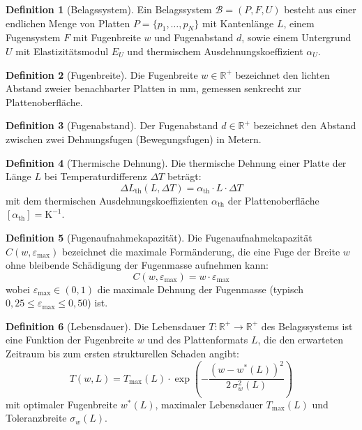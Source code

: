 ﻿\documentclass[a4paper,12pt]{article}
\theoremstyle{definition}
\newtheorem{definition}{Definition}
\begin{document}
\begin{definition}[Belagssystem]
	Ein Belagssystem $\mathcal{B} = (P, F, U)$ besteht aus einer endlichen
	Menge von Platten $P = \{p_1, \ldots, p_N\}$ mit Kantenlänge $L$,
	einem Fugensystem $F$ mit Fugenbreite $w$ und Fugenabstand $d$,
	sowie einem Untergrund $U$ mit Elastizitätsmodul $E_U$ und
	thermischem Ausdehnungskoeffizient $\alpha_U$.
\end{definition}

\begin{definition}[Fugenbreite]
	Die Fugenbreite $w \in \mathbb{R}^+$ bezeichnet den lichten Abstand
	zweier benachbarter Platten in mm, gemessen senkrecht zur
	Plattenoberfläche.
\end{definition}

\begin{definition}[Fugenabstand]
	Der Fugenabstand $d \in \mathbb{R}^+$ bezeichnet den Abstand
	zwischen zwei Dehnungsfugen (Bewegungsfugen) in Metern.
\end{definition}

\begin{definition}[Thermische Dehnung]
	Die thermische Dehnung einer Platte der Länge $L$ bei
	Temperaturdifferenz $\Delta T$ beträgt:
	\[
	\Delta L_{\text{th}}(L,\Delta T) = \alpha_{\text{th}} \cdot L \cdot \Delta T
	\]
	mit dem thermischen Ausdehnungskoeffizienten $\alpha_{\text{th}}$
	der Plattenoberfläche $[\alpha_{\text{th}}] = \mathrm{K}^{-1}$.
\end{definition}

\begin{definition}[Fugenaufnahmekapazität]
	Die Fugenaufnahmekapazität $C(w, \varepsilon_{\max})$ bezeichnet die
	maximale Formänderung, die eine Fuge der Breite $w$ ohne bleibende
	Schädigung der Fugenmasse aufnehmen kann:
	\[
	C(w, \varepsilon_{\max}) = w \cdot \varepsilon_{\max}
	\]
	wobei $\varepsilon_{\max} \in (0,1)$ die maximale Dehnung der
	Fugenmasse (typisch $0{,}25 \leq \varepsilon_{\max} \leq 0{,}50$) ist.
\end{definition}

\begin{definition}[Lebensdauer]
	Die Lebensdauer $T: \mathbb{R}^+ \to \mathbb{R}^+$ des Belagssystems
	ist eine Funktion der Fugenbreite $w$ und des Plattenformats $L$,
	die den erwarteten Zeitraum bis zum ersten strukturellen Schaden angibt:
	\[
	T(w, L) = T_{\max}(L) \cdot \exp\!\left(-\frac{(w - w^*(L))^2}{2\,\sigma_w^2(L)}\right)
	\]
	mit optimaler Fugenbreite $w^*(L)$, maximaler Lebensdauer $T_{\max}(L)$
	und Toleranzbreite $\sigma_w(L)$.
\end{definition}
\end{document}
